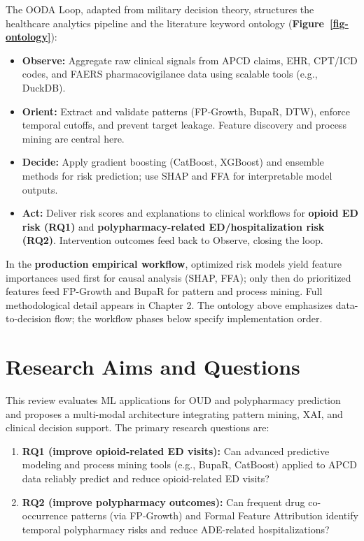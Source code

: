\documentclass[
  12pt,
]{book}
\providecommand{\tightlist}{%
  \setlength{\itemsep}{0pt}\setlength{\parskip}{0pt}}
\begin{document}
The OODA Loop, adapted from military decision theory, structures the
healthcare analytics pipeline and the literature keyword ontology
(\textbf{Figure~\ref{fig-ontology}}):

\begin{itemize}
\tightlist
\item
  \textbf{Observe:} Aggregate raw clinical signals from APCD claims,
  EHR, CPT/ICD codes, and FAERS pharmacovigilance data using scalable
  tools (e.g., DuckDB).
\item
  \textbf{Orient:} Extract and validate patterns (FP-Growth, BupaR,
  DTW), enforce temporal cutoffs, and prevent target leakage. Feature
  discovery and process mining are central here.
\item
  \textbf{Decide:} Apply gradient boosting (CatBoost, XGBoost) and
  ensemble methods for risk prediction; use SHAP and FFA for
  interpretable model outputs.
\item
  \textbf{Act:} Deliver risk scores and explanations to clinical
  workflows for \textbf{opioid ED risk (RQ1)} and
  \textbf{polypharmacy-related ED/hospitalization risk (RQ2)}.
  Intervention outcomes feed back to Observe, closing the loop.
\end{itemize}

In the \textbf{production empirical workflow}, optimized risk models
yield feature importances used first for causal analysis (SHAP, FFA);
only then do prioritized features feed FP-Growth and BupaR for pattern
and process mining. Full methodological detail appears in Chapter 2. The
ontology above emphasizes data-to-decision flow; the workflow phases
below specify implementation order.

\section{Research Aims and Questions}\label{research-aims-and-questions}

This review evaluates ML applications for OUD and polypharmacy
prediction and proposes a multi-modal architecture integrating pattern
mining, XAI, and clinical decision support. The primary research
questions are:

\begin{enumerate}
\def\labelenumi{\arabic{enumi}.}
\tightlist
\item
  \textbf{RQ1 (improve opioid-related ED visits):} Can advanced
  predictive modeling and process mining tools (e.g., BupaR, CatBoost)
  applied to APCD data reliably predict and reduce opioid-related ED
  visits?
\item
  \textbf{RQ2 (improve polypharmacy outcomes):} Can frequent drug
  co-occurrence patterns (via FP-Growth) and Formal Feature Attribution
  identify temporal polypharmacy risks and reduce ADE-related
  hospitalizations?
\end{enumerate}
\end{document}

